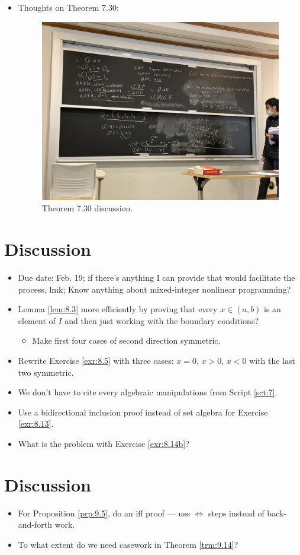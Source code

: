 \documentclass{report}
\begin{document}
\begin{itemize}
    \item {}Thoughts on Theorem 7.30:
    \begin{figure}[h!]
        \centering
        \includegraphics[width=0.5\linewidth]{ExtFiles/theorem7-30.JPG}
        \caption{Theorem 7.30 discussion.}
        \label{fig:theorem7-30}
    \end{figure}
\end{itemize}






\section{Discussion}
\begin{itemize}
    \item {}Due date: Feb. 19; if there's anything I can provide that would facilitate the process, lmk; Know anything about mixed-integer nonlinear programming?
    \item Lemma \ref{lem:8.3} more efficiently by proving that every $x\in(a,b)$ is an element of $I$ and then just working with the boundary conditions?
    \begin{itemize}
        \item Make first four cases of second direction symmetric.
    \end{itemize}
    \item Rewrite Exercise \ref{exr:8.5} with three cases: $x=0$, $x>0$, $x<0$ with the last two symmetric.
    \item We don't have to cite every algebraic manipulations from Script \ref{sct:7}.
    \item {}Use a bidirectional inclusion proof instead of set algebra for Exercise \ref{exr:8.13}.
    \item What is the problem with Exercise \ref{exr:8.14b}?
\end{itemize}






\section{Discussion}
\begin{itemize}
    \item {}For Proposition \ref{prp:9.5}, do an iff proof --- use $\Longleftrightarrow$ steps instead of back-and-forth work.
    \item {}To what extent do we need casework in Theorem \ref{trm:9.14}?
\end{itemize}
\end{document}
